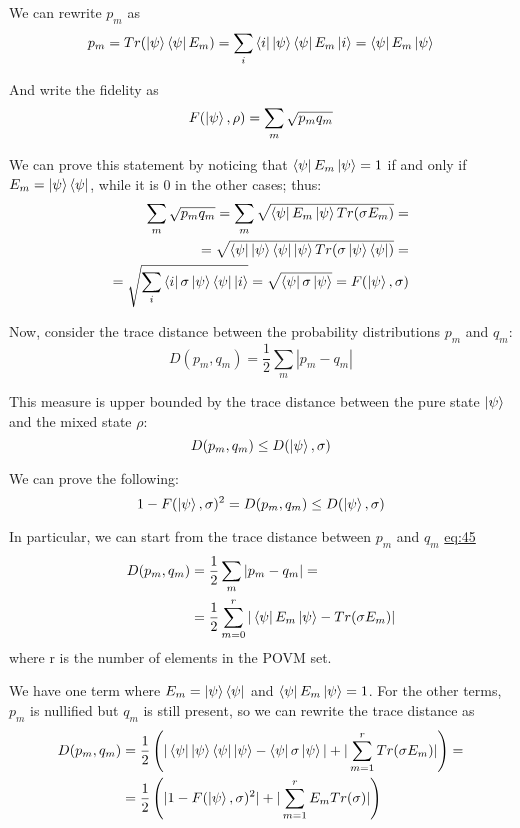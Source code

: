 \documentclass{masterthesis}
\begin{document}
We can rewrite $p_m$ as
\begin{equation}
    p_m = Tr(\ket{\psi}\bra{\psi} E_m) = \sum_{i} \bra{i} \ket{\psi}\bra{\psi} E_m \ket{i} = \bra{\psi}E_m\ket{\psi}
\end{equation}

And write the fidelity as
\begin{equation}
    F(\ket{\psi}, \rho) = \sum_{m} \sqrt{p_m q_m} 
\end{equation}

We can prove this statement by noticing that $\bra{\psi}E_m\ket{\psi} = 1$ if and only if $E_m = \ket{\psi}\bra{\psi}$, while it is 0 in the other cases; thus:
\begin{align}
    \sum_{m} \sqrt{p_m q_m} = \sum_{m} \sqrt{\bra{\psi}E_m\ket{\psi} Tr(\sigma E_m)} = \\
    = \sqrt{\bra{\psi}\ket{\psi}\bra{\psi}\ket{\psi} Tr(\sigma \ket{\psi}\bra{\psi})} = \\
    = \sqrt{\sum_{i} \bra{i} \sigma \ket{\psi}\bra{\psi} \ket{i}} = \sqrt{\bra{\psi} \sigma \ket{\psi}} = F(\ket{\psi}, \sigma)
\end{align}

Now, consider the trace distance between the probability distributions $p_m$ and $q_m$:
\begin{equation}\label{eq:trace-dist}
    D(p_m, q_m) = \frac{1}{2} \sum_{m} |p_m - q_m|
\end{equation}

This measure is upper bounded by the trace distance between the pure state $\ket{\psi}$ and the mixed state $\rho$:
\begin{equation}
    D(p_m, q_m) \leq D(\ket{\psi}, \sigma)
\end{equation}


We can prove the following:
\begin{equation}
    1 - F(\ket{\psi}, \sigma)^2 = D(p_m, q_m) \leq D(\ket{\psi}, \sigma)
\end{equation}

In particular, we can start from the trace distance between $p_m$ and $q_m$ \hyperref[eq:trace-dist]{eq:45}
\begin{align}
    D(p_m, q_m) &= \frac{1}{2} \sum_{m} |p_m - q_m| = \\
    &= \frac{1}{2} \sum_{m=0}^{r} |\bra{\psi}E_m\ket{\psi} - Tr(\sigma E_m)|
\end{align}
where r is the number of elements in the POVM set.

We have one term where $E_m = \ket{\psi}\bra{\psi}$ and $\bra{\psi}E_m\ket{\psi} = 1$.
For the other terms, $p_m$ is nullified but $q_m$ is still present, so we can rewrite the trace distance as
\begin{align}
    D(p_m, q_m) &= \frac{1}{2} \left(|\bra{\psi}\ket{\psi}\bra{\psi}\ket{\psi} - \bra{\psi} \sigma \ket{\psi} | + | \sum_{m=1}^{r} Tr(\sigma E_m)|\right) = \\
    &= \frac{1}{2} \left(|1 - F(\ket{\psi}, \sigma)^2 | + | \sum_{m=1}^{r} E_m Tr(\sigma)|\right)
\end{align}
\end{document}
